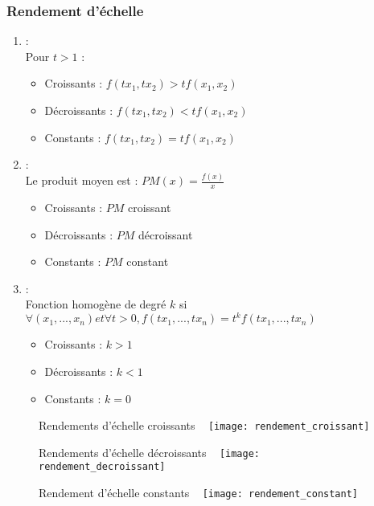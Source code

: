\subsubsection{Rendement d'échelle}

\begin{enumerate}
\item {} :\\
Pour $t > 1$ :
	\begin{itemize}
	\item Croissants : $f(tx_1, tx_2) > tf(x_1, x_2)$
	\item Décroissants : $f(tx_1, tx_2) < tf(x_1, x_2)$
	\item Constants : $f(tx_1, tx_2) = tf(x_1, x_2)$
	\end{itemize}
\item {} :\\
Le produit moyen est : $PM(x) = \frac{f(x)}{x}$
	\begin{itemize}
	\item Croissants : $PM$ croissant
	\item Décroissants : $PM$ décroissant
	\item Constants : $PM$ constant
	\end{itemize}
\item {} :\\
Fonction homogène de degré $k$ si $\forall(x_1, ..., x_n) et \forall t>0, f(tx_1, ..., tx_n) = t^k f(tx_1, ..., tx_n)$
	\begin{itemize}
	\item Croissants : $k > 1$
	\item Décroissants : $k < 1$
	\item Constants : $k = 0$
	\end{itemize}
\end{enumerate}

\begin{minipage}{0.33\textwidth}
	\begin{figure}[H]
		\centering
		Rendements d'échelle croissants
		~
		\texttt{[image: rendement\_croissant]}
	\end{figure}
\end{minipage}
\begin{minipage}{0.33\textwidth}
	\begin{figure}[H]
		\centering
		Rendements d'échelle décroissants
		~
		\texttt{[image: rendement\_decroissant]}
	\end{figure}
\end{minipage}
\begin{minipage}{0.33\textwidth}
	\begin{figure}[H]
		\centering
		Rendement d'échelle constants
		~
		\texttt{[image: rendement\_constant]}
	\end{figure}
\end{minipage}


